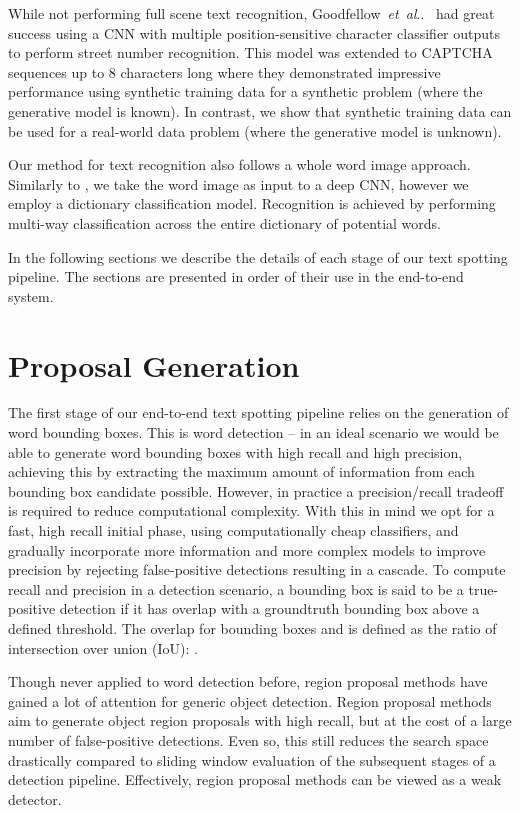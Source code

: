 \documentclass[twocolumn]{svjour3}          \smartqed  \usepackage{epsfig}
\makeatletter
\DeclareRobustCommand\onedot{\futurelet\@let@token\@onedot}
\def\@onedot{\ifx\@let@token.\else.\null\fi\xspace}
\def\etal{\emph{et~al}\onedot}
\makeatother
\begin{document}
While not performing full scene text recognition, Goodfellow~\etal~\cite{Goodfellow13} had great success using a CNN with multiple position-sensitive character classifier outputs to perform street number recognition. This model was extended to CAPTCHA sequences up to 8 characters long where they demonstrated impressive performance using synthetic training data for a synthetic problem (where the generative model is known). In contrast, we show that synthetic training data can be used for a real-world data problem (where the generative model is unknown).

Our method for text recognition also follows a whole word image approach. Similarly to \cite{Goodfellow13}, we take the word image as input to a deep CNN, however we employ a dictionary classification model. Recognition is achieved by performing multi-way classification across the entire dictionary of potential words.

In the following sections we describe the details of each stage of our text spotting pipeline. The sections are presented in order of their use in the end-to-end system.

\section{Proposal Generation}
\label{sec:proposals}

The first stage of our end-to-end text spotting pipeline relies on the generation of word bounding boxes. This is word detection -- in an ideal scenario we would be able to generate word bounding boxes with high recall and high precision, achieving this by extracting the maximum amount of information from each bounding box candidate possible. However, in practice a precision/recall tradeoff is required to reduce computational complexity. With this in mind we opt for a fast, high recall initial phase, using computationally cheap classifiers, and gradually incorporate more information and more complex models to improve precision by rejecting false-positive detections resulting in a cascade. To compute recall and precision in a detection scenario, a bounding box is said to be a true-positive detection if it has overlap with a groundtruth bounding box above a defined threshold. The overlap for bounding boxes  and  is defined as the ratio of intersection over union (IoU): .

Though never applied to word detection before, region proposal methods have gained a lot of attention for generic object detection. Region proposal methods~\cite{Uijlings13,Alexe12, Cheng14,Zitnick14} aim to generate object region proposals with high recall, but at the cost of a large number of false-positive detections. Even so, this still reduces the search space drastically compared to sliding window evaluation of the subsequent stages of a detection pipeline. Effectively, region proposal methods can be viewed as a weak detector.
\end{document}
